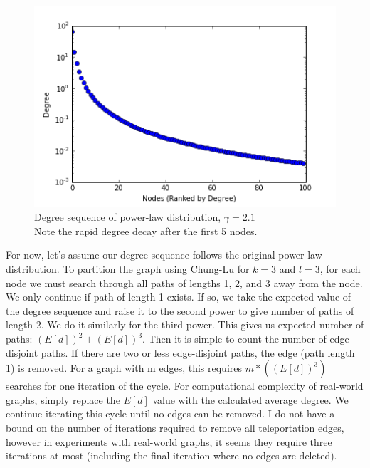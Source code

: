 \documentclass{article}
\begin{document}
\begin{figure}
\begin{center}
\includegraphics[width=\linewidth]{powerlawdeg.png}
  \caption{Degree sequence of power-law distribution, $\gamma = 2.1$\\
  Note the rapid degree decay after the first 5 nodes.}
  \end{center}
  \end{figure}

For now, let's assume our degree sequence follows the original power law distribution. To partition the graph using Chung-Lu for $k = 3$ and $l = 3$, for each node we must search through all paths of lengths 1, 2, and 3 away from the node. We only continue if path of length 1 exists. If so, we take the expected value of the degree sequence and raise it to the second power to give number of paths of length 2. We do it similarly for the third power. This gives us expected number of paths: $(E[d])^{2}+(E[d])^{3}$. Then it is simple to count the number of edge-disjoint paths. If there are two or less edge-disjoint paths, the edge (path length 1) is removed. For a graph with m edges, this requires $m*((E[d])^{3})$ searches for one iteration of the cycle. For computational complexity of real-world graphs, simply replace the $E[d]$ value with the calculated average degree. We continue iterating this cycle until no edges can be removed. I do not have a bound on the number of iterations required to remove all teleportation edges, however in experiments with real-world graphs, it seems they require three iterations at most (including the final iteration where no edges are deleted).
\end{document}
